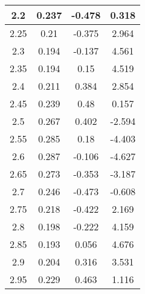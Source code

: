 \begin{multicols}{2}
\begin{longtable}{|c|c|c|c|}
    \hline
    2.2      & 0.237        & -0.478                                 & 0.318                                        \\
    \hline
    2.25     & 0.21         & -0.375                                 & 2.964                                        \\
    \hline
    2.3      & 0.194        & -0.137                                 & 4.561                                        \\
    \hline
    2.35     & 0.194        & 0.15                                   & 4.519                                        \\
    \hline
    2.4      & 0.211        & 0.384                                  & 2.854                                        \\
    \hline
    2.45     & 0.239        & 0.48                                   & 0.157                                        \\
    \hline
    2.5      & 0.267        & 0.402                                  & -2.594                                       \\
    \hline
    2.55     & 0.285        & 0.18                                   & -4.403                                       \\
    \hline
    2.6      & 0.287        & -0.106                                 & -4.627                                       \\
    \hline
    2.65     & 0.273        & -0.353                                 & -3.187                                       \\
    \hline
    2.7      & 0.246        & -0.473                                 & -0.608                                       \\
    \hline
    2.75     & 0.218        & -0.422                                 & 2.169                                        \\
    \hline
    2.8      & 0.198        & -0.222                                 & 4.159                                        \\
    \hline
    2.85     & 0.193        & 0.056                                  & 4.676                                        \\
    \hline
    2.9      & 0.204        & 0.316                                  & 3.531                                        \\
    \hline
    2.95     & 0.229        & 0.463                                  & 1.116                                        \\

\end{longtable}
\end{multicols}
